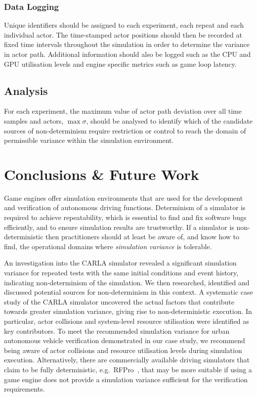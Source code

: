 \subsubsection{Data Logging}
Unique identifiers should be assigned to each experiment, each repeat and each individual actor. 
The time-stamped actor positions should then be recorded at fixed time intervals throughout the simulation in order to determine the variance in actor path. Additional information should also be logged such as the CPU and GPU utilisation levels and engine specific metrics such as game loop latency.

\subsection{Analysis}
For each experiment, the maximum value of actor path deviation over all time samples and actors, $\max\sigma$, should be analysed to identify which of the candidate sources of non-determinism require restriction or control to reach the domain of permissible variance within the simulation environment. 

\section{Conclusions \& Future Work}\label{s:conclusion}

Game engines offer simulation environments that are used for the development and verification of autonomous driving functions. Determinism of a simulator is required to achieve repeatability, which is essential to find and fix software bugs efficiently, and to ensure simulation results are trustworthy. If a simulator is non-deterministic then practitioners should at least be aware of, and know how to find, the operational domains where \textit{simulation variance} is tolerable. 

An investigation into the CARLA simulator revealed a significant simulation variance for repeated tests with the same initial conditions and event history, indicating non-determinism of the simulation. We then researched, identified and discussed potential sources for non-determinism in this context. A systematic case study of the CARLA simulator uncovered the actual factors that contribute towards greater simulation variance, giving rise to non-deterministic execution. In particular, actor collisions and system-level resource utilisation were identified as key contributors. To meet the recommended simulation variance for urban autonomous vehicle verification demonstrated in our case study, we recommend being aware of actor collisions and resource utilisation levels during simulation execution. Alternatively, there are commercially available driving simulators that claim to be fully deterministic, e.g.\ RFPro~\cite{rFpro2021}, that may be more suitable if using a game engine does not provide a simulation variance sufficient for the verification requirements.

